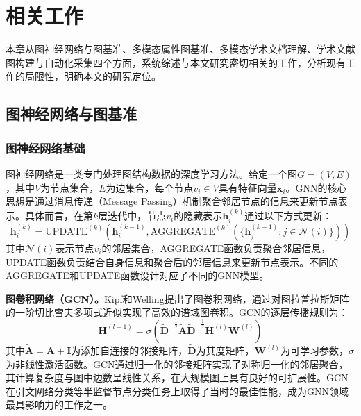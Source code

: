 
\chapter{相关工作}

本章从图神经网络与图基准、多模态属性图基准、多模态学术文档理解、学术文献图构建与自动化采集四个方面，系统综述与本文研究密切相关的工作，分析现有工作的局限性，明确本文的研究定位。

\section{图神经网络与图基准}

\subsection{图神经网络基础}

图神经网络是一类专门处理图结构数据的深度学习方法。给定一个图$G=(V, E)$，其中$V$为节点集合，$E$为边集合，每个节点$v_i \in V$具有特征向量$\mathbf{x}_i$。GNN的核心思想是通过消息传递（Message Passing）机制聚合邻居节点的信息来更新节点表示\cite{gilmer2017mpnn}。具体而言，在第$k$层迭代中，节点$v_i$的隐藏表示$\mathbf{h}_i^{(k)}$通过以下方式更新：
\begin{equation}
  \mathbf{h}_i^{(k)} = \text{UPDATE}^{(k)}\left(\mathbf{h}_i^{(k-1)}, \text{AGGREGATE}^{(k)}\left(\{\mathbf{h}_j^{(k-1)} : j \in \mathcal{N}(i)\}\right)\right)
  \label{eq:message_passing}
\end{equation}
其中$\mathcal{N}(i)$表示节点$v_i$的邻居集合，AGGREGATE函数负责聚合邻居信息，UPDATE函数负责结合自身信息和聚合后的邻居信息来更新节点表示。不同的AGGREGATE和UPDATE函数设计对应了不同的GNN模型。

\textbf{图卷积网络（GCN）。}Kipf和Welling\cite{kipf2017gcn}提出了图卷积网络，通过对图拉普拉斯矩阵的一阶切比雪夫多项式近似实现了高效的谱域图卷积。GCN的逐层传播规则为：
\begin{equation}
  \mathbf{H}^{(l+1)} = \sigma\left(\tilde{\mathbf{D}}^{-\frac{1}{2}}\tilde{\mathbf{A}}\tilde{\mathbf{D}}^{-\frac{1}{2}}\mathbf{H}^{(l)}\mathbf{W}^{(l)}\right)
  \label{eq:gcn}
\end{equation}
其中$\tilde{\mathbf{A}} = \mathbf{A} + \mathbf{I}$为添加自连接的邻接矩阵，$\tilde{\mathbf{D}}$为其度矩阵，$\mathbf{W}^{(l)}$为可学习参数，$\sigma$为非线性激活函数。GCN通过归一化的邻接矩阵实现了对称归一化的邻居聚合，其计算复杂度与图中边数呈线性关系，在大规模图上具有良好的可扩展性。GCN在引文网络分类等半监督节点分类任务上取得了当时的最佳性能，成为GNN领域最具影响力的工作之一。


